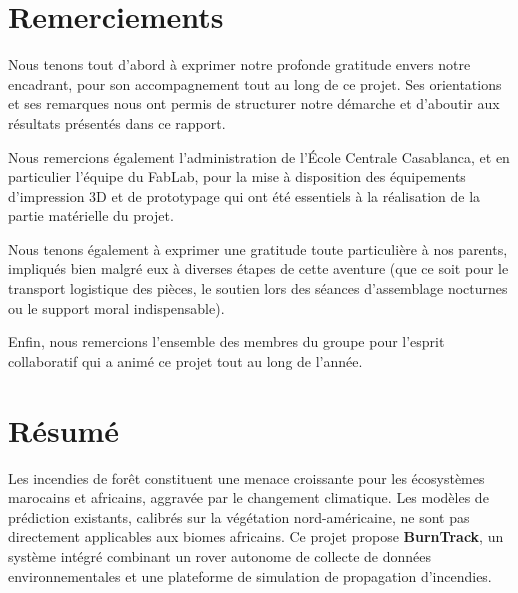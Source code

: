 \documentclass[a4paper,12pt,openany,titlepage]{scrartcl}
\begin{document}
\section{Remerciements}

Nous tenons tout d'abord à exprimer notre profonde gratitude envers notre encadrant, pour son accompagnement tout au long de ce projet. Ses orientations et ses remarques nous ont permis de structurer notre démarche et d'aboutir aux résultats présentés dans ce rapport.

Nous remercions également l'administration de l'École Centrale Casablanca, et en particulier l'équipe du FabLab, pour la mise à disposition des équipements d'impression 3D et de prototypage qui ont été essentiels à la réalisation de la partie matérielle du projet.

Nous tenons également à exprimer une gratitude toute particulière à nos parents, impliqués bien malgré eux à diverses étapes de cette aventure (que ce soit pour le transport logistique des pièces, le soutien lors des séances d'assemblage nocturnes ou le support moral indispensable).

Enfin, nous remercions l'ensemble des membres du groupe pour l'esprit collaboratif qui a animé ce projet tout au long de l'année.

\vspace{0.8cm}

\section{Résumé}

Les incendies de forêt constituent une menace croissante pour les écosystèmes marocains et africains, aggravée par le changement climatique. Les modèles de prédiction existants, calibrés sur la végétation nord-américaine, ne sont pas directement applicables aux biomes africains. Ce projet propose \textbf{BurnTrack}, un système intégré combinant un rover autonome de collecte de données environnementales et une plateforme de simulation de propagation d'incendies.
\end{document}
